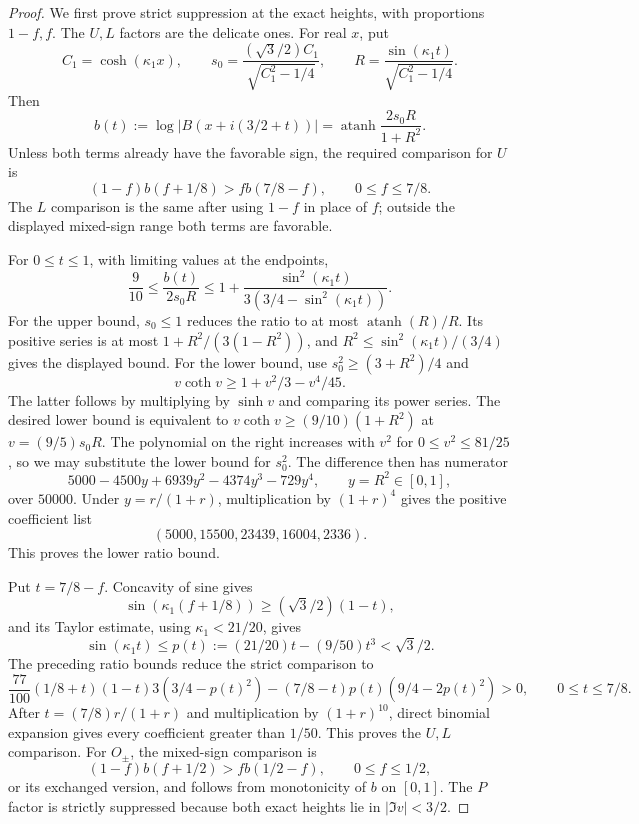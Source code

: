 \begin{proof}
We first prove strict suppression at the exact heights, with proportions \(1-f,f\). The \(U,L\) factors are the delicate ones. For real \(x\), put
\[
C_1=\cosh(\kappa_1x),\qquad
s_0=\frac{(\sqrt3/2)C_1}{\sqrt{C_1^2-1/4}},\qquad
R=\frac{\sin(\kappa_1t)}{\sqrt{C_1^2-1/4}}.
\]
Then
\[
b(t):=\log|B(x+i(3/2+t))|
=\operatorname{atanh}\frac{2s_0R}{1+R^2}.
\]
Unless both terms already have the favorable sign, the required comparison for \(U\) is
\[
(1-f)b(f+1/8)>f b(7/8-f),\qquad 0\le f\le7/8.
\]
The \(L\) comparison is the same after using \(1-f\) in place of \(f\); outside the displayed mixed-sign range both terms are favorable.

For \(0\le t\le1\), with limiting values at the endpoints,
\[
\frac9{10}\le\frac{b(t)}{2s_0R}
\le1+\frac{\sin^2(\kappa_1t)}
{3(3/4-\sin^2(\kappa_1t))}.
\]
For the upper bound, \(s_0\le1\) reduces the ratio to at most
\(\operatorname{atanh}(R)/R\). Its positive series is at most
\(1+R^2/(3(1-R^2))\), and \(R^2\le\sin^2(\kappa_1t)/(3/4)\) gives the displayed bound. For the lower bound, use
\(s_0^2\ge(3+R^2)/4\) and
\[
v\coth v\ge1+v^2/3-v^4/45.
\]
The latter follows by multiplying by \(\sinh v\) and comparing its power series. The desired lower bound is equivalent to \(v\coth v\ge(9/10)(1+R^2)\) at \(v=(9/5)s_0R\). The polynomial on the right increases with \(v^2\) for \(0\le v^2\le81/25\), so we may substitute the lower bound for \(s_0^2\). The difference then has numerator
\[
5000-4500y+6939y^2-4374y^3-729y^4,\qquad y=R^2\in[0,1],
\]
over \(50000\). Under \(y=r/(1+r)\), multiplication by \((1+r)^4\) gives the positive coefficient list
\[
(5000,15500,23439,16004,2336).
\]
This proves the lower ratio bound.

Put \(t=7/8-f\). Concavity of sine gives
\[
\sin(\kappa_1(f+1/8))\ge(\sqrt3/2)(1-t),
\]
and its Taylor estimate, using \(\kappa_1<21/20\), gives
\[
\sin(\kappa_1t)\le p(t):=(21/20)t-(9/50)t^3<\sqrt3/2.
\]
The preceding ratio bounds reduce the strict comparison to
\[
\frac{77}{100}(1/8+t)(1-t)3(3/4-p(t)^2)
-(7/8-t)p(t)(9/4-2p(t)^2)>0,\qquad 0\le t\le7/8.
\]
After \(t=(7/8)r/(1+r)\) and multiplication by \((1+r)^{10}\), direct binomial expansion gives every coefficient greater than \(1/50\). This proves the \(U,L\) comparison. For \(O_\pm\), the mixed-sign comparison is
\[
(1-f)b(f+1/2)>f b(1/2-f),\qquad 0\le f\le1/2,
\]
or its exchanged version, and follows from monotonicity of \(b\) on \([0,1]\). The \(P\) factor is strictly suppressed because both exact heights lie in \(|\Im v|<3/2\).


\end{proof}
